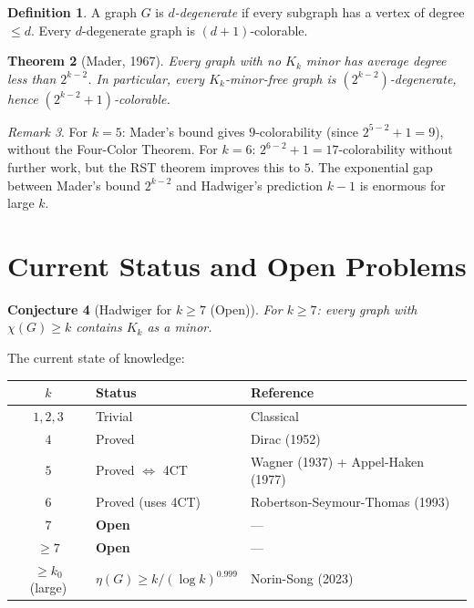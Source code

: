 \documentclass[12pt,a4paper]{amsart}
\newtheorem{theorem}{Theorem}[section]
\newtheorem{conjecture}[theorem]{Conjecture}
\theoremstyle{definition}
\newtheorem{definition}[theorem]{Definition}
\theoremstyle{remark}
\newtheorem{remark}[theorem]{Remark}
\begin{document}
\begin{definition}
A graph $G$ is \emph{$d$-degenerate} if every subgraph has a vertex of degree
$\leq d$. Every $d$-degenerate graph is $(d+1)$-colorable.
\end{definition}

\begin{theorem}[Mader, 1967]\label{thm:mader}
Every graph with no $K_k$ minor has average degree less than $2^{k-2}$. In
particular, every $K_k$-minor-free graph is $(2^{k-2})$-degenerate, hence
$(2^{k-2}+1)$-colorable.
\end{theorem}

\begin{remark}
For $k = 5$: Mader's bound gives $9$-colorability (since $2^{5-2}+1 = 9$),
without the Four-Color Theorem. For $k = 6$: $2^{6-2}+1 = 17$-colorability
without further work, but the RST theorem improves this to $5$. The exponential gap between
Mader's bound $2^{k-2}$ and Hadwiger's prediction $k-1$ is enormous for large $k$.
\end{remark}

\section{Current Status and Open Problems}

\begin{conjecture}[Hadwiger for $k \geq 7$ (Open)]\label{conj:open7}
For $k \geq 7$: every graph with $\chi(G) \geq k$ contains $K_k$ as a minor.
\end{conjecture}

The current state of knowledge:
\begin{center}
\begin{tabular}{cll}
\toprule
$k$ & Status & Reference \\
\midrule
$1, 2, 3$ & Trivial & Classical \\
$4$ & Proved & Dirac (1952) \\
$5$ & Proved $\Leftrightarrow$ 4CT & Wagner (1937) + Appel-Haken (1977) \\
$6$ & Proved (uses 4CT) & Robertson-Seymour-Thomas (1993) \\
$7$ & \textbf{Open} & — \\
$\geq 7$ & \textbf{Open} & — \\
$\geq k_0$ (large) & $\eta(G) \geq k/(\log k)^{0.999}$ & Norin-Song (2023) \\
\bottomrule
\end{tabular}
\end{center}
\end{document}
